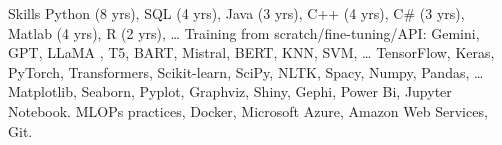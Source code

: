 
\begin{rubric}{Skills}
\entry*[Coding]
Python (8 yrs), SQL (4 yrs), Java (3 yrs), C++ (4 yrs), C\# (3 yrs), Matlab (4 yrs),  R (2 yrs), \ldots
{} Training from scratch/fine-tuning/API: Gemini,  GPT, LLaMA , T5, BART, Mistral, BERT, KNN, SVM,  \ldots
{}
    TensorFlow, Keras, PyTorch, Transformers, Scikit-learn, SciPy, NLTK, Spacy, Numpy, Pandas, \ldots
\entry*[Visualization]
    Matplotlib, Seaborn, Pyplot, Graphviz, Shiny, Gephi, Power Bi, Jupyter Notebook.
\entry*[Deployment]
    MLOPs practices, Docker, Microsoft Azure, Amazon Web Services, Git.
\end{rubric}
